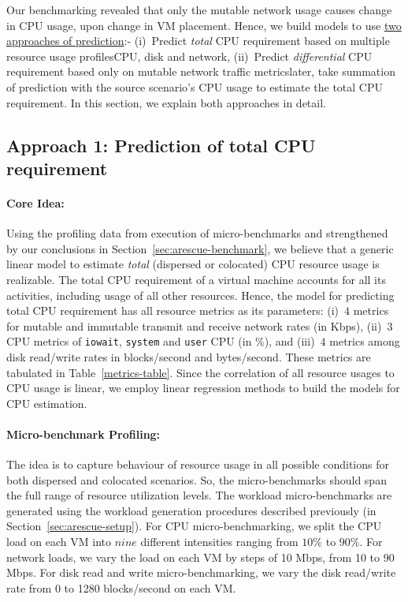 Our benchmarking revealed that only the mutable network usage
causes change in CPU usage, upon change in VM placement.
Hence, we build models to use \underline{two approaches of prediction}:-
(i)~Predict \textit{total} CPU requirement based on multiple
resource usage profiles\textemdash{}CPU, disk and network,
(ii)~Predict \textit{differential} CPU requirement based only on
mutable network traffic metrics\textemdash{}later, take summation
of prediction with the source scenario's CPU usage to estimate
the total CPU requirement.
In this section, we explain both approaches in detail.

\subsection{Approach 1: Prediction of total CPU requirement}

\paragraph{Core Idea: } Using the profiling data from 
execution of micro-benchmarks and strengthened
by our conclusions in Section~\ref{sec:arescue-benchmark}, we 
believe that a generic linear model to estimate 
\textit{total} (dispersed or colocated) CPU resource usage
is realizable. 
The total CPU requirement of a virtual machine accounts for all its
activities, including usage of all other resources. Hence, the model
for predicting total CPU requirement has all resource metrics as its
parameters: (i)~$4$ metrics for mutable and
immutable transmit and receive network rates (in Kbps),
(ii)~$3$ CPU metrics of \texttt{iowait}, \texttt{system}
and \texttt{user} CPU (in \%), and
(iii)~$4$ metrics among disk read/write rates in
blocks/second and bytes/second. These metrics are
tabulated in Table~\ref{metrics-table}.
Since the correlation of all resource usages to CPU usage is linear, we employ
linear regression methods to build the models for CPU estimation.

\paragraph{Micro-benchmark Profiling: } The idea is to capture 
behaviour of resource usage in all possible conditions
for both dispersed and colocated scenarios. So, the micro-benchmarks
should span the full range of resource utilization levels. 
The workload micro-benchmarks are generated using the workload
generation procedures described previously (in 
Section~\ref{sec:arescue-setup}). 
For CPU micro-benchmarking, we split the CPU load on each VM
into $nine$ different intensities
ranging from $10\%$ to $90\%$. 
For network loads, we vary the load on each VM by steps 
of 10 Mbps, from 10 to 90 Mbps.
For disk read and write
micro-benchmarking, we vary the disk read/write rate from 
0 to 1280 blocks/second on each VM.


